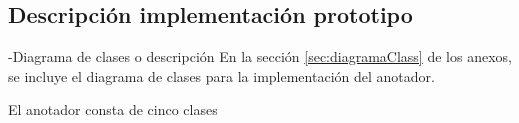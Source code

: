 % 
% 
% 
% 

\subsection{Descripción implementación prototipo}
-Diagrama de clases o descripción\newline
En la sección \ref{sec:diagramaClass} de los anexos, se incluye el diagrama de
clases para la implementación del anotador.\newline

El anotador consta de cinco clases 



